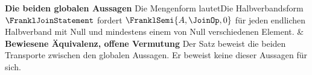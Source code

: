 \begin{BandUebersicht}
\textbf{Die beiden globalen Aussagen}
Die Mengenform lautetDie Halbverbandsform \(\FranklJoinStatement\) fordert
\(\FranklSemi{A,\JoinOp,0}\) für jeden endlichen Halbverband mit Null
und mindestens einem von Null verschiedenen Element.
&
\textbf{Bewiesene Äquivalenz, offene Vermutung}
Der Satz beweist die beiden Transporte zwischen den globalen
Aussagen. Er beweist keine dieser Aussagen für sich.
 \\
\addlinespace[.8ex]
\end{BandUebersicht}

